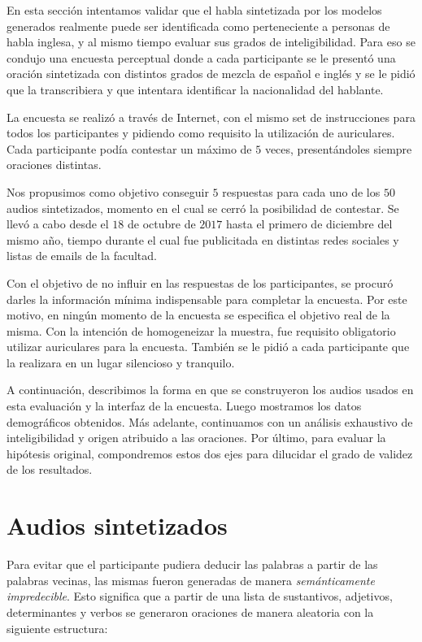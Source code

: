 
En esta sección intentamos validar que el habla sintetizada por los modelos generados realmente puede ser identificada como perteneciente a personas de habla inglesa, y al mismo tiempo evaluar sus grados de inteligibilidad. Para eso se condujo una encuesta perceptual donde a cada participante se le presentó una oración sintetizada con distintos grados de mezcla de español e inglés y se le pidió que la transcribiera y que intentara identificar la nacionalidad del hablante. 

La encuesta se realizó a través de Internet, con el mismo set de instrucciones para todos los participantes y pidiendo como requisito la utilización de auriculares. Cada participante podía contestar un máximo de $5$ veces, presentándoles siempre oraciones distintas.

Nos propusimos como objetivo conseguir $5$ respuestas para cada uno de los $50$ audios sintetizados, momento en el cual se cerró la posibilidad de contestar. Se llevó a cabo desde el $18$ de octubre de $2017$ hasta el primero de diciembre del mismo año, tiempo durante el cual fue publicitada en distintas redes sociales y listas de emails de la facultad.

Con el objetivo de no influir en las respuestas de los participantes, se procuró darles la información mínima indispensable para completar la encuesta. Por este motivo, en ningún momento de la encuesta se especifica el objetivo real de la misma. Con la intención de homogeneizar la muestra, fue requisito obligatorio utilizar auriculares para la encuesta. También se le pidió a cada participante que la realizara en un lugar silencioso y tranquilo.

A continuación, describimos la forma en que se construyeron los audios usados en esta evaluación y la interfaz de la encuesta. Luego mostramos los datos demográficos  obtenidos. Más adelante, continuamos con un análisis exhaustivo de inteligibilidad y origen atribuido a las oraciones.
Por último, para evaluar la hipótesis original, compondremos estos dos ejes para dilucidar el grado de validez de los resultados.

\section{Audios sintetizados}

Para evitar que el participante pudiera deducir las palabras a partir de las palabras vecinas, las mismas fueron generadas de manera \textit{semánticamente impredecible}. Esto significa que a partir de una lista de sustantivos, adjetivos, determinantes y verbos se generaron oraciones de manera aleatoria con la siguiente estructura:

